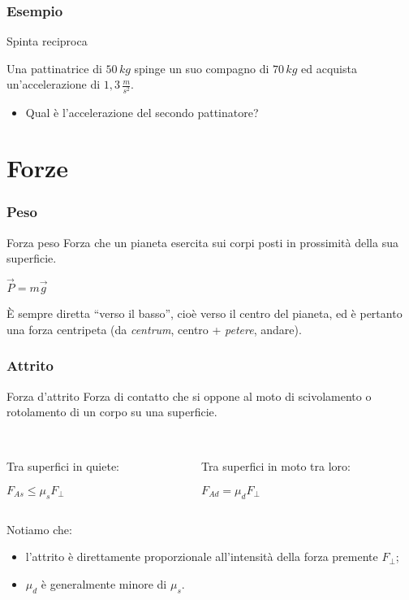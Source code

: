 \documentclass[]{beamer}
\theoremstyle{plain}
\begin{document}
\begin{frame}
\frametitle{Esempio}
\begin{exampleblock}{Spinta reciproca}
{\small Una pattinatrice di $ 50 \, kg $ spinge un suo compagno di $ 70 \, kg $ ed acquista un'accelerazione di $ 1,3 \, \frac{m}{s^2} $.

\begin{itemize}
  \item Qual è l'accelerazione del secondo pattinatore?
\end{itemize}}
\end{exampleblock}
\end{frame}



\section{Forze}

\begin{frame}
  \frametitle{Peso}
\begin{block}{Forza peso}
Forza che un pianeta esercita sui corpi posti in prossimità della sua superficie.\pause
\begin{center}
\colorbox{blue!30}{$ \vec{P} = m \vec{g} $}
\end{center}
\end{block}\pause
È sempre diretta ``verso il basso'', cioè verso il centro del pianeta, ed è pertanto una forza \alert{centripeta} (da \emph{centrum}, centro + \emph{petere}, andare).
\end{frame}



\begin{frame}
\frametitle{Attrito}  
\begin{block}{Forza d'attrito}
Forza di contatto che si oppone al moto di scivolamento o rotolamento di un corpo su una superficie.\\~\\\pause
\begin{columns}
\begin{column}{0.45\textwidth}
Tra superfici in quiete:
\begin{center}
\colorbox{blue!30}{$ F_{As} \leq \mu_s F_\perp $}
\end{center}
\end{column}
\begin{column}{0.45\textwidth}
Tra superfici in moto tra loro:
\begin{center}
\colorbox{blue!30}{$ F_{Ad} = \mu_d F_\perp $}
\end{center}
\end{column}
\end{columns}
\end{block}\pause
Notiamo che:
\begin{itemize}
  \item l'attrito è direttamente proporzionale all'intensità della \alert{forza premente} $ F_\perp $;\pause
  \item $ \mu_d $ è generalmente minore di $ \mu_s $.
\end{itemize}
\end{frame}
\end{document}
